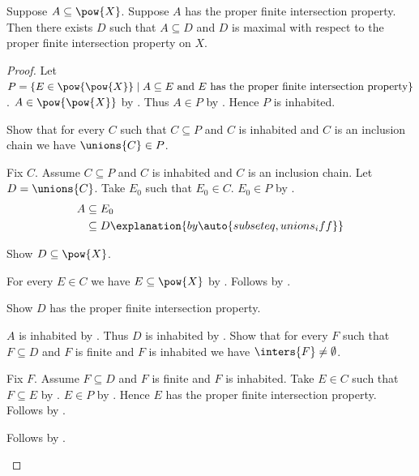 \begin{theorem}\label{maximal_proper_fip_extension}
    Suppose $A\subseteq\pow{X}$.
    Suppose $A$ has the proper finite intersection property.
    Then there exists $D$ such that $A\subseteq D$ and
        $D$ is maximal with respect to the proper finite intersection property on $X$.
\end{theorem}
\begin{proof}
    Let $P=\{E\in\pow{\pow{X}}\mid
        \text{$A\subseteq E$ and $E$ has the proper finite intersection property}\}$.
    $A\in\pow{\pow{X}}$ by .
    Thus $A\in P$ by .
    Hence $P$ is inhabited.

    Show that for every $C$ such that $C\subseteq P$ and $C$ is inhabited
        and $C$ is an inclusion chain we have $\unions{C}\in P$.
    \begin{subproof}
        Fix $C$.
        Assume $C\subseteq P$ and $C$ is inhabited and
            $C$ is an inclusion chain.
        Let $D=\unions{C}$.
        Take $E_0$ such that $E_0\in C$.
        $E_0\in P$ by .
        \begin{align*}
            A
                &\subseteq E_0
                \\
                &\subseteq D
                    \explanation{by \auto{subseteq,unions_iff}}
        \end{align*}

        Show $D\subseteq\pow{X}$.
        \begin{subproof}
            For every $E\in C$ we have $E\subseteq\pow{X}$
                by .
            Follows by .
        \end{subproof}

        Show $D$ has the proper finite intersection property.
        \begin{subproof}
            $A$ is inhabited by .
            Thus $D$ is inhabited by .
            Show that for every $F$ such that $F\subseteq D$ and $F$ is finite
                and $F$ is inhabited we have $\inters{F}\neq\emptyset$.
            \begin{subproof}
                Fix $F$.
                Assume $F\subseteq D$ and $F$ is finite and $F$ is inhabited.
                Take $E\in C$ such that $F\subseteq E$
                    by .
                $E\in P$ by .
                Hence $E$ has the proper finite intersection property.
                Follows by .
            \end{subproof}
            Follows by .
        \end{subproof}


\end{subproof}
\end{proof}
